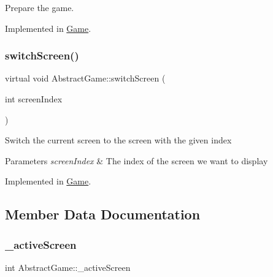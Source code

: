 Prepare the game. 



Implemented in \mbox{\hyperlink{class_game_a91946f348c9334abd083dfebfecdd31d}{Game}}.

\mbox{\label{class_abstract_game_afd50e09c9b23aff40c752990947f07ce}} 
\subsubsection{\texorpdfstring{switch\+Screen()}{switchScreen()}}
{\footnotesize\ttfamily virtual void Abstract\+Game\+::switch\+Screen (\begin{DoxyParamCaption}\item[{int}]{screen\+Index }\end{DoxyParamCaption})\hspace{0.3cm}{\ttfamily [pure virtual]}}



Switch the current screen to the screen with the given index 


\begin{DoxyParams}{Parameters}
{\em screen\+Index} & The index of the screen we want to display\\
\hline
\end{DoxyParams}


Implemented in \mbox{\hyperlink{class_game_a0e1dd146112c54290e11d3e5f0a36fdd}{Game}}.



\subsection{Member Data Documentation}
\mbox{\label{class_abstract_game_ab5e3089bdd788319c1a240992018c355}} 
\subsubsection{\texorpdfstring{\+\_\+active\+Screen}{\_activeScreen}}
{\footnotesize\ttfamily int Abstract\+Game\+::\+\_\+active\+Screen\hspace{0.3cm}{\ttfamily [protected]}}



